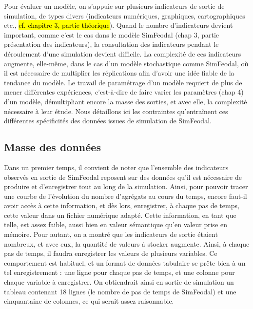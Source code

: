 Pour évaluer un modèle, on s’appuie sur plusieurs indicateurs de sortie de simulation, de types divers (indicateurs numériques, graphiques, cartographiques etc., \hl{cf. chapitre 3, partie théorique}).
Quand le nombre d'indicateurs devient important, comme c'est le cas dans le modèle SimFeodal (chap 3, partie présentation des indicateurs), la consultation des indicateurs pendant le déroulement d'une simulation devient difficile.
La complexité de ces indicateurs augmente, elle-même, dans le cas d'un modèle stochastique comme SimFeodal, où il est nécessaire de multiplier les réplications afin d'avoir une idée fiable de la tendance du modèle.
Le travail de paramétrage d'un modèle requiert de plus de mener différentes expériences, c'est-à-dire de faire varier les paramètres (chap 4) d'un modèle, démultipliant encore la masse des sorties, et avec elle, la complexité nécessaire à leur étude.
Nous détaillons ici les contraintes qu’entraînent ces différentes spécificités des données issues de simulation de SimFeodal.

	\subsection{Masse des données}
	Dans un premier temps, il convient de noter que l'ensemble des indicateurs observés en sortie de SimFeodal reposent sur des données qu'il est nécessaire de produire et d'enregistrer tout au long de la simulation.
	Ainsi, pour pouvoir tracer une courbe de l'évolution du nombre d'agrégats au cours du temps, encore faut-il avoir accès à cette information, et dès lors, enregistrer, à chaque pas de temps, cette valeur dans un fichier numérique adapté.
	Cette information, en tant que telle, est assez faible, aussi bien en valeur sémantique qu'en valeur prise en mémoire.
	Pour autant, on a montré que les indicateurs de sortie étaient nombreux, et avec eux, la quantité de valeurs à stocker augmente.
	Ainsi, à chaque pas de temps, il faudra enregistrer les valeurs de plusieurs variables.
	Ce comportement est habituel, et un format de données tabulaire se prête bien à un tel enregistrement : une ligne pour chaque pas de temps, et une colonne pour chaque variable à enregistrer.
	On obtiendrait ainsi en sortie de simulation un tableau contenant 18 lignes (le nombre de pas de temps de SimFeodal) et une cinquantaine de colonnes, ce qui serait assez raisonnable.

